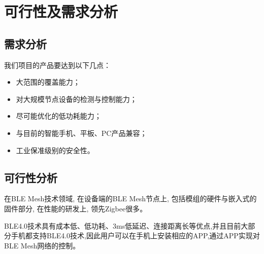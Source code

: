 \chapter{可行性及需求分析}

\section{需求分析}
我们项目的产品要达到以下几点：
  \begin{itemize}
    \item 大范围的覆盖能力；
    \item 对大规模节点设备的检测与控制能力；
    \item 尽可能优化的低功耗能力；
    \item 与目前的智能手机、平板、PC产品兼容；
    \item 工业保准级别的安全性。
  \end{itemize}
\section{可行性分析}
在BLE Mesh技术领域, 在设备端的BLE Mesh节点上, 包括模组的硬件与嵌入式的固件部分, 在性能的研发上, 领先Zigbee很多。

BLE4.0技术具有成本低、低功耗、3ms低延迟、连接距离长等优点,并且目前大部分手机都支持BLE4.0技术,因此用户可以在手机上安装相应的APP,通过APP实现对BLE Mesh网络的控制。\cite{compareblezig}